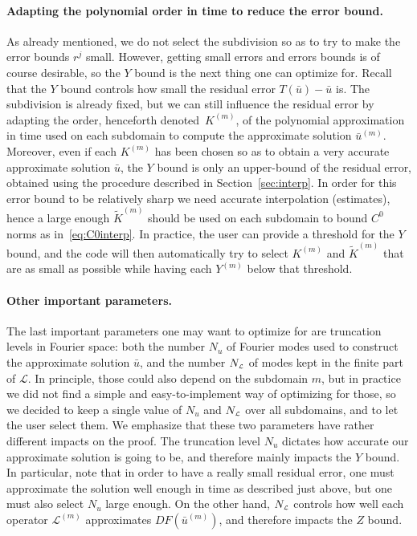 \documentclass[10pt,a4paper]{article}
\theoremstyle{plain}
\renewcommand{\L}{\mathcal{L}}
\newcommand{\bu}{\bar{u}}
\newcommand{\1}{\mathbf{1}}
\newcommand{\NL}{N_{\text{\tiny{$\L$}}}}
\begin{document}
\paragraph{Adapting the polynomial order in time to reduce the error bound.} As already mentioned, we do not select the subdivision so as to try to make the error bounds $r^j$ small. However, getting small errors and errors bounds is of course desirable, so the $Y$ bound is the next thing one can optimize for. Recall that the $Y$ bound controls how small the residual error $T(\bu)-\bu$ is. The subdivision is already fixed, but we can still influence the residual error by adapting the order, henceforth denoted~$K^{(m)}$, of the polynomial approximation in time used on each subdomain to compute the approximate solution $\bu^{(m)}$. Moreover, even if each $K^{(m)}$ has been chosen so as to obtain a very accurate approximate solution $\bu$, the $Y$ bound is only an upper-bound of the residual error, obtained using the procedure described in Section~\ref{sec:interp}. In order for this error bound to be relatively sharp we need accurate interpolation (estimates), hence a large enough $\tilde{K}^{(m)}$ should be used on each subdomain to bound $C^0$ norms as in~\eqref{eq:C0interp}. In practice, the user can provide a threshold for the $Y$ bound, and the code will then automatically try to select $K^{(m)}$ and $\tilde{K}^{(m)}$ that are as small as possible while having each $Y^{(m)}$ below that threshold.

\paragraph{Other important parameters.}
The last important parameters one may want to optimize for are truncation levels in Fourier space: both the number $N_u$ of Fourier modes used to construct the approximate solution $\bu$, and the number $\NL$ of modes kept in the finite part of $\L$. In principle, those could also depend on the subdomain $m$, but in practice we did not find a simple and easy-to-implement way of optimizing for those, so we decided to keep a single value of $N_u$ and $\NL$ over all subdomains, and to let the user select them. We emphasize that these two parameters have rather different impacts on the proof. The truncation level $N_u$ dictates how accurate our approximate solution is going to be, and therefore mainly impacts the $Y$ bound. In particular, note that in order to have a really small residual error, one must approximate the solution well enough in time as described just above, but one must also select $N_u$ large enough. On the other hand, $\NL$ controls how well each operator $\L^{(m)}$ approximates $DF(\bu^{(m)})$, and therefore impacts the $Z$ bound. 
\end{document}
